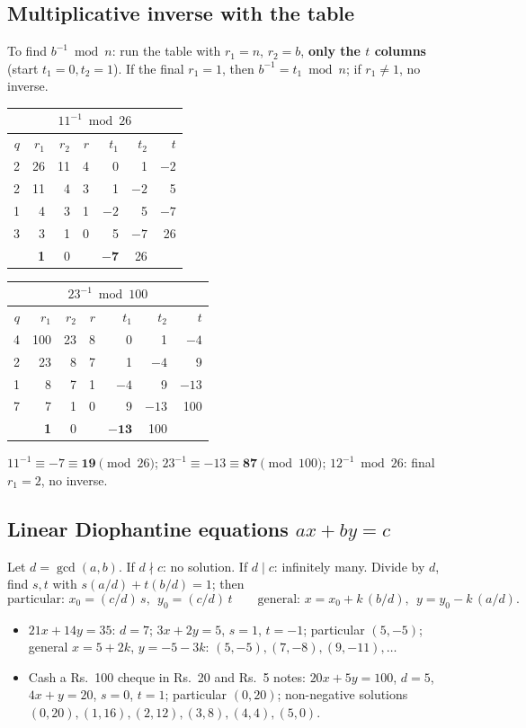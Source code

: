 \subsection{Multiplicative inverse with the table}
To find $b^{-1} \bmod n$: run the table with $r_1 = n$, $r_2 = b$, \textbf{only the $t$ columns} (start $t_1 = 0, t_2 = 1$). If the final $r_1 = 1$, then $b^{-1} = t_1 \bmod n$; if $r_1 \ne 1$, no inverse.
\begin{center}\small
\begin{tabular}{@{}r|rrr|rrr@{}}
\multicolumn{7}{c}{$11^{-1} \bmod 26$}\\
\toprule
$q$ & $r_1$ & $r_2$ & $r$ & $t_1$ & $t_2$ & $t$\\
\midrule
2 & 26 & 11 & 4 & 0 & 1 & $-2$\\
2 & 11 & 4 & 3 & 1 & $-2$ & 5\\
1 & 4 & 3 & 1 & $-2$ & 5 & $-7$\\
3 & 3 & 1 & 0 & 5 & $-7$ & 26\\
 & \textbf{1} & 0 & & $\mathbf{-7}$ & 26 & \\
\bottomrule
\end{tabular}
\quad
\begin{tabular}{@{}r|rrr|rrr@{}}
\multicolumn{7}{c}{$23^{-1} \bmod 100$}\\
\toprule
$q$ & $r_1$ & $r_2$ & $r$ & $t_1$ & $t_2$ & $t$\\
\midrule
4 & 100 & 23 & 8 & 0 & 1 & $-4$\\
2 & 23 & 8 & 7 & 1 & $-4$ & 9\\
1 & 8 & 7 & 1 & $-4$ & 9 & $-13$\\
7 & 7 & 1 & 0 & 9 & $-13$ & 100\\
 & \textbf{1} & 0 & & $\mathbf{-13}$ & 100 & \\
\bottomrule
\end{tabular}
\end{center}
$11^{-1} \equiv -7 \equiv \mathbf{19} \pmod{26}$; \;$23^{-1} \equiv -13 \equiv \mathbf{87} \pmod{100}$; \;$12^{-1} \bmod 26$: final $r_1 = 2$, no inverse.

\subsection{Linear Diophantine equations $ax + by = c$}
Let $d = \gcd(a, b)$. If $d \nmid c$: no solution. If $d \mid c$: infinitely many. Divide by $d$, find $s, t$ with $s(a/d) + t(b/d) = 1$; then
\[
\text{particular: } x_0 = (c/d)\,s,\ \ y_0 = (c/d)\,t \qquad \text{general: } x = x_0 + k\,(b/d),\ \ y = y_0 - k\,(a/d).
\]
\begin{itemize}
  \item $21x + 14y = 35$: $d = 7$; $3x + 2y = 5$, $s = 1$, $t = -1$; particular $(5, -5)$; general $x = 5 + 2k$, $y = -5 - 3k$: $(5,-5), (7,-8), (9,-11), \dots$
  \item Cash a Rs.~100 cheque in Rs.~20 and Rs.~5 notes: $20x + 5y = 100$, $d = 5$, $4x + y = 20$, $s = 0$, $t = 1$; particular $(0, 20)$; non-negative solutions $(0,20), (1,16), (2,12), (3,8), (4,4), (5,0)$.
\end{itemize}

